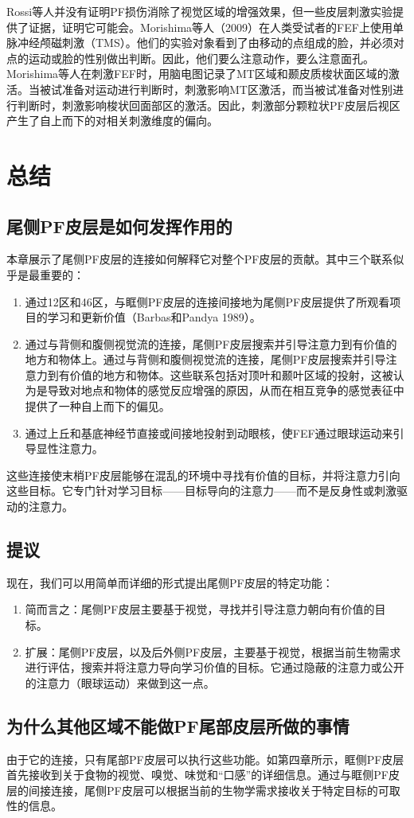Rossi等人并没有证明PF损伤消除了视觉区域的增强效果，但一些皮层刺激实验提供了证据，证明它可能会。Morishima等人（2009）在人类受试者的FEF上使用单脉冲经颅磁刺激（TMS）。他们的实验对象看到了由移动的点组成的脸，并必须对点的运动或脸的性别做出判断。因此，他们要么注意动作，要么注意面孔。Morishima等人在刺激FEF时，用脑电图记录了MT区域和颞皮质梭状面区域的激活。当被试准备对运动进行判断时，刺激影响MT区激活，而当被试准备对性别进行判断时，刺激影响梭状回面部区的激活。因此，刺激部分颗粒状PF皮层后视区产生了自上而下的对相关刺激维度的偏向。
\section{总结}
\subsection{尾侧PF皮层是如何发挥作用的}
本章展示了尾侧PF皮层的连接如何解释它对整个PF皮层的贡献。其中三个联系似乎是最重要的：
\begin{enumerate}
	\item 通过12区和46区，与眶侧PF皮层的连接间接地为尾侧PF皮层提供了所观看项目的学习和更新价值（Barbas和Pandya 1989）。
	\item 通过与背侧和腹侧视觉流的连接，尾侧PF皮层搜索并引导注意力到有价值的地方和物体上。通过与背侧和腹侧视觉流的连接，尾侧PF皮层搜索并引导注意力到有价值的地方和物体。这些联系包括对顶叶和颞叶区域的投射，这被认为是导致对地点和物体的感觉反应增强的原因，从而在相互竞争的感觉表征中提供了一种自上而下的偏见。
	\item 通过上丘和基底神经节直接或间接地投射到动眼核，使FEF通过眼球运动来引导显性注意力。
\end{enumerate}
这些连接使末梢PF皮层能够在混乱的环境中寻找有价值的目标，并将注意力引向这些目标。它专门针对学习目标——目标导向的注意力——而不是反身性或刺激驱动的注意力。
\subsection{提议}
现在，我们可以用简单而详细的形式提出尾侧PF皮层的特定功能：
\begin{enumerate}
	\item 简而言之：尾侧PF皮层主要基于视觉，寻找并引导注意力朝向有价值的目标。
	\item 扩展：尾侧PF皮层，以及后外侧PF皮层，主要基于视觉，根据当前生物需求进行评估，搜索并将注意力导向学习价值的目标。它通过隐蔽的注意力或公开的注意力（眼球运动）来做到这一点。
\end{enumerate}
\subsection{为什么其他区域不能做PF尾部皮层所做的事情}
由于它的连接，只有尾部PF皮层可以执行这些功能。如第四章所示，眶侧PF皮层首先接收到关于食物的视觉、嗅觉、味觉和“口感”的详细信息。通过与眶侧PF皮层的间接连接，尾侧PF皮层可以根据当前的生物学需求接收关于特定目标的可取性的信息。

